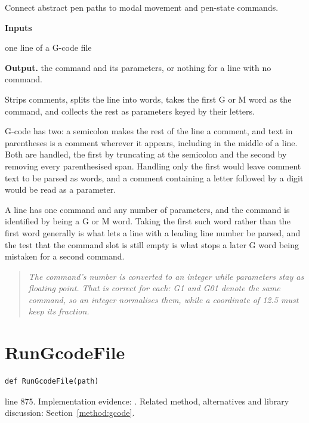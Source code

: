 Connect abstract pen paths to modal movement and pen-state commands.




\noindent\textbf{Inputs}
\begin{description}[leftmargin=2.2em,style=nextline,font=\normalfont\ttfamily]\setlength\itemsep{1pt}
  \item[{raw}] \normalfont one line of a G-code file
\end{description}

\noindent\textbf{Output.} the command and its parameters, or nothing for a line with no command.


Strips comments, splits the line into words, takes the first G or M word as the command, and collects the rest as parameters keyed by their letters.


G-code has two: a semicolon makes the rest of the line a comment, and text in parentheses is a comment wherever it appears, including in the middle of a line. Both are handled, the first by truncating at the semicolon and the second by removing every parenthesised span. Handling only the first would leave comment text to be parsed as words, and a comment containing a letter followed by a digit would be read as a parameter.


A line has one command and any number of parameters, and the command is identified by being a G or M word. Taking the first such word rather than the first word generally is what lets a line with a leading line number be parsed, and the test that the command slot is still empty is what stops a later G word being mistaken for a second command.


\begin{quote}\small\itshape The command's number is converted to an integer while parameters stay as floating point. That is correct for each: G1 and G01 denote the same command, so an integer normalises them, while a coordinate of 12.5 must keep its fraction.\end{quote}


\section{RunGcodeFile}\label{fn:reproduce:RunGcodeFile}
\begin{lstlisting}[style=sig]
def RunGcodeFile(path)
\end{lstlisting}
 line 875. Implementation evidence: \cite{code2026}. Related method, alternatives and library discussion: Section~\ref{method:gcode}.


